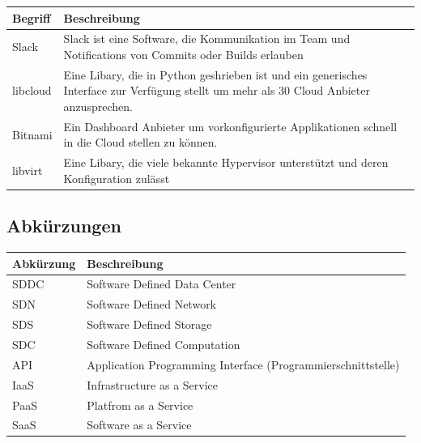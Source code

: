 \documentclass[11pt]{scrartcl}
\begin{document}
\begin{tabularx}{\linewidth}{l | X}
    \textbf{Begriff} & \textbf{Beschreibung}\\
    \hline
     Slack &  Slack ist eine Software, die Kommunikation im Team und Notifications von 
     Commits oder Builds erlauben\\
    \hline
    libcloud & Eine Libary, die in Python geshrieben ist und ein generisches 
    Interface zur Verfügung stellt um mehr als 30 Cloud Anbieter anzusprechen.\\
    \hline
    Bitnami & Ein Dashboard Anbieter um vorkonfigurierte Applikationen schnell in die Cloud 
    stellen zu können.\\
    \hline
    libvirt & Eine Libary, die viele bekannte Hypervisor unterstützt und deren 
    Konfiguration zulässt\\
    \hline
\end{tabularx}

\subsection{Abkürzungen}
\begin{tabularx}{\linewidth}{l | X}
    \textbf{Abkürzung} & \textbf{Beschreibung}\\
    \hline
    SDDC & Software Defined Data Center\\
    \hline
    SDN & Software Defined Network\\
    \hline
    SDS & Software Defined Storage\\
    \hline
    SDC & Software Defined Computation\\
    \hline
    API & Application Programming Interface (Programmierschnittstelle)\\
    \hline
    IaaS & Infrastructure as a Service\\
    \hline
    PaaS & Platfrom as a Service\\
    \hline
    SaaS & Software as a Service\\
\end{tabularx}
\end{document}
